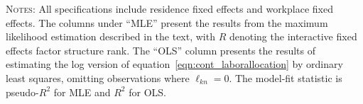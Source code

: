 \documentclass[11pt]{article}
\theoremstyle{definition}
\begin{document}
\begin{table}[hbt]
\caption{Commuting elasticity estimates from IFE specification}
\label{tab:elasticity:IFE}
\begin{center}
\vspace{-5mm}

\begin{minipage}{0.95\textwidth}
{\footnotesize \textsc{Notes}: 
All specifications include residence fixed effects and workplace fixed effects.
The columns under  ``MLE''  present the results from the maximum likelihood estimation described in the text, with \(R\) denoting the interactive fixed effects factor structure rank.
The ``OLS'' column presents the results of estimating the log version of equation~\eqref{eqn:cont_laborallocation} by ordinary least squares, omitting observations where $\ell_{kn}=0$.
The model-fit statistic is pseudo-$R^2$ for MLE and $R^2$ for OLS.}
\end{minipage}
\end{center}
\vspace{-1.5em}
\end{table}
\end{document}
